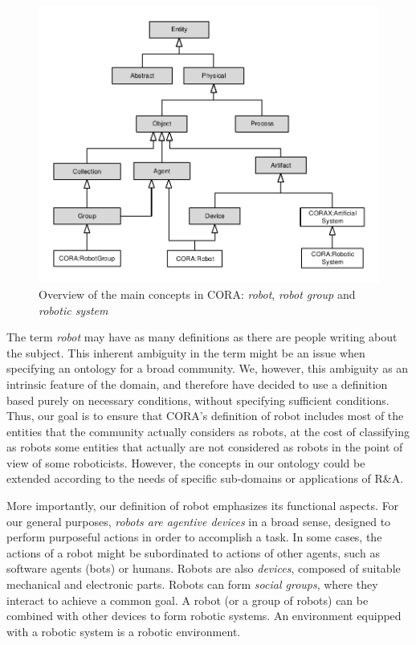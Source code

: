 \documentclass[preprint,12pt]{elsarticle}
\begin{document}
\begin{figure}[th] 
	\centering  
	\includegraphics[width=1\textwidth]{figs/cora}  
	\caption{Overview of the main concepts in CORA: \emph{robot}, \emph{robot group} and \emph{robotic system}}  
	\label{fig:completeontology}  
\end{figure}  


The term \textit{robot} may have as many definitions as there are people writing about the subject. This inherent ambiguity in the term might be an issue when specifying an ontology for a broad community. We, however, this ambiguity as an intrinsic feature of the domain, and therefore have decided to use a definition based purely on necessary conditions, without specifying sufficient conditions. Thus, our goal is to ensure that CORA's definition of robot includes most of the entities that the community actually considers as robots, at the cost of classifying as robots some entities that actually are not considered as robots in the point of view of some roboticists. However, the concepts in our ontology could be extended according to the needs of specific sub-domains or applications of R\&A.

More importantly, our definition of robot emphasizes its functional aspects. For our general purposes, {\it robots are agentive devices} in a broad sense, designed to perform purposeful actions in order to accomplish a task. In some cases, the actions of a robot might be subordinated to actions of other agents, such as software agents (bots) or humans. Robots are also \emph{devices}, composed of suitable mechanical and electronic parts. Robots can form \emph{social groups}, where they interact to achieve a common goal. A robot (or a group of robots) can be combined with other devices to form robotic systems. An environment equipped with a robotic system is a robotic environment.
\end{document}
